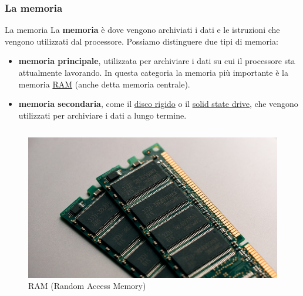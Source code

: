 \subsubsection[La memoria]{La memoria}
\begin{frame}
	
	\begin{block}{La memoria}
		La \textbf{memoria} è dove vengono archiviati i dati e le istruzioni che vengono utilizzati dal processore. Possiamo distinguere due tipi di memoria:
		\begin{itemize}
			\item \textbf{memoria principale}, utilizzata per archiviare i dati su cui il processore sta attualmente lavorando.
			In questa categoria la memoria più importante è la memoria \underline{RAM} (anche detta memoria centrale).
			\item \textbf{memoria secondaria}, come il \underline{disco rigido} o il \underline{solid state drive}, che vengono utilizzati per archiviare i dati a lungo termine.
		\end{itemize}
	\end{block}
	
	\begin{columns}			
		\begin{figure}[!htbp]
			\centering
			\includegraphics[width=0.78\linewidth]{images/3_architetture/memory_ram.jpg}
			\caption{RAM (Random Access Memory)}
			\label{fig:architectures_memory_ram}
		\end{figure}
					

\end{columns}
\end{frame}
